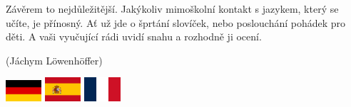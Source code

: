 \documentclass[12pt, a4paper]{article}
\begin{document}
\begin{multicols}{2}
		Závěrem to nejdůležitější. Jakýkoliv mimoškolní kontakt s jazykem, který se učíte, je přínosný. Ať už jde o šprtání slovíček, nebo poslouchání pohádek pro děti. A vaši vyučující rádi uvidí snahu a rozhodně ji ocení. 
		\par \begin{flushright}
			 \footnotesize (Jáchym Löwenhöffer)
		\end{flushright}
		\begin{multicols}{3}
			\begin{center}
				\includegraphics[width=0.1\textwidth]{G}
				\includegraphics[width=0.1\textwidth]{S}
				\includegraphics[width=0.1\textwidth]{FR}
			\end{center}
		\end{multicols}
		
		


	\end{multicols}
\end{document}
